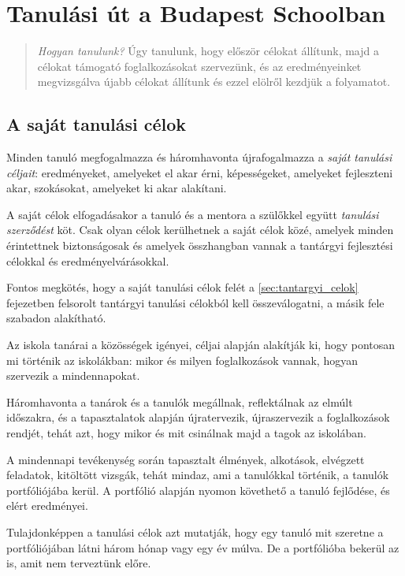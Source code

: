 \chapter{Tanulási út a Budapest Schoolban}

\begin{quote}
\emph{Hogyan tanulunk?}
Úgy tanulunk, hogy először célokat állítunk, majd a célokat támogató
foglalkozásokat szervezünk, és az eredményeinket megvizsgálva újabb
célokat állítunk és ezzel elölről kezdjük a folyamatot.
\end{quote}

\section{A saját tanulási célok}

Minden tanuló megfogalmazza és háromhavonta újrafogalmazza a \emph{saját tanulási céljait}: eredményeket, amelyeket el akar érni, képességeket, amelyeket fejleszteni akar, szokásokat, amelyeket ki akar alakítani.

A saját célok elfogadásakor a tanuló és a mentora a szülőkkel együtt \emph{tanulási szerződést} köt. Csak olyan célok kerülhetnek a saját célok közé, amelyek minden érintettnek biztonságosak és amelyek összhangban vannak a tantárgyi fejlesztési célokkal és eredményelvárásokkal.

Fontos megkötés, hogy a saját tanulási célok felét a \ref{sec:tantargyi_celok} fejezetben felsorolt tantárgyi tanulási célokból kell összeválogatni, a másik fele szabadon alakítható.

Az iskola tanárai a közösségek igényei, céljai alapján alakítják ki, hogy pontosan mi történik az iskolákban: mikor és milyen foglalkozások vannak, hogyan szervezik a mindennapokat.

Háromhavonta a tanárok és a tanulók megállnak, reflektálnak az elmúlt időszakra, és a tapasztalatok alapján újratervezik, újraszervezik a foglalkozások rendjét, tehát azt, hogy mikor és mit csinálnak majd a tagok az iskolában.

A mindennapi tevékenység során tapasztalt élmények, alkotások, elvégzett feladatok, kitöltött vizsgák, tehát mindaz, ami a tanulókkal történik, a tanulók portfóliójába kerül. A portfólió alapján nyomon követhető a tanuló fejlődése, és elért eredményei.

Tulajdonképpen a tanulási célok azt mutatják, hogy egy tanuló mit szeretne a portfóliójában látni három hónap vagy egy év múlva. De a portfólióba bekerül az is, amit nem terveztünk előre.

